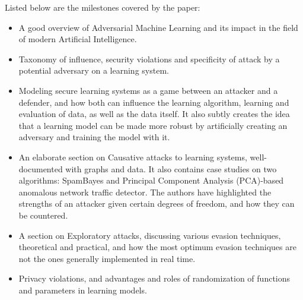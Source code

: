 \documentclass[twoside,twocolumn]{article}
\begin{document}
Listed below are the milestones covered by the paper: 
\begin{itemize}
\item A good overview of Adversarial Machine Learning and its impact in the field of modern Artificial Intelligence.

\item Taxonomy of influence, security violations and specificity of attack by a potential adversary on a learning system.

\item Modeling secure learning systems as a game between an attacker and a defender, and how both can influence the learning algorithm, learning and evaluation of data, as well as the data itself. It also subtly creates the idea that a learning model can be made more robust by artificially creating an adversary and training the model with it.

\item An elaborate section on Causative attacks to learning systems, well-documented with graphs and data. It also contains case studies on two algorithms: SpamBayes and Principal Component Analysis (PCA)-based anomalous network traffic detector. The authors have highlighted the strengths of an attacker given certain degrees of freedom, and how they can be countered.

\item A section on Exploratory attacks, discussing various evasion techniques, theoretical and practical, and how the most optimum evasion techniques are not the ones generally implemented in real time.

\item Privacy violations, and advantages and roles of randomization of functions and parameters in learning models.
\end{itemize}

\end{document}
